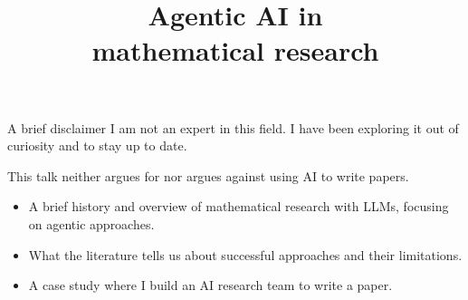 \documentclass[11pt,aspectratio=169]{beamer}
\title{Agentic AI in\\mathematical research}
\author{}
\date{}
\begin{document}
\begin{frame}[plain]
  \vspace{10mm}
  {\inserttitle\par}
\end{frame}

\begin{frame}[t]{A brief disclaimer}
  I am not an expert in this field. I have been exploring it out of curiosity
  and to stay up to date.

  \vspace{3mm}
  This talk neither argues for nor argues against using AI to write papers.

  \vspace{3mm}
  \begin{itemize}
    \setlength{\itemsep}{3.5mm}
    \item A brief history and overview of mathematical research with LLMs,
      focusing on agentic approaches.
    \item What the literature tells us about successful approaches
      and their limitations.
    \item A case study where I build an AI research team to write a paper.
  \end{itemize}
\end{frame}
\end{document}
